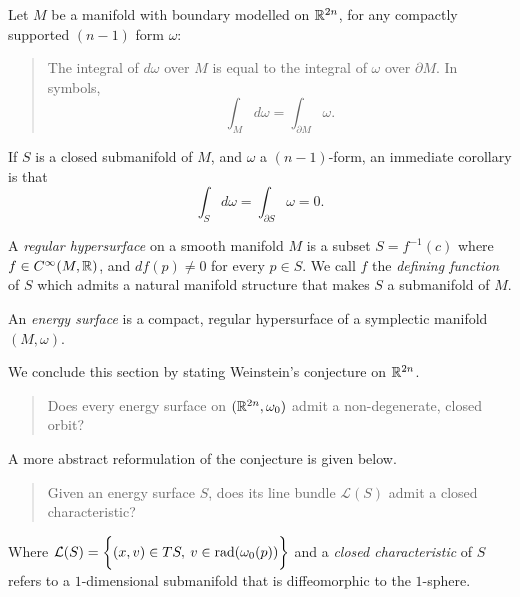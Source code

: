 \documentclass[../main-v2-manifolds.tex]{subfiles}
\begin{document}
\begin{remark}
    Let $M$ be a manifold with boundary modelled on ${\mathbb{R}^{2n}}$, for any compactly supported $(n-1)$ form $\omega$:
    \begin{quote}
        The integral of $d\omega$ over $M$ is equal to the integral of $\omega$ over $\partial M$. In symbols,
        \[\int_{M}d\omega = \int_{\partial M}\omega.\]
    \end{quote}
    If $S$ is a closed submanifold of $M$, and $\omega$ a $(n-1)$-form, an immediate corollary is that
    \[\int_S d\omega = \int_{\partial S}\omega = 0.\]
\end{remark}
\begin{definition}\label{def:regular hypersurface}
    A \emph{regular hypersurface} on a smooth manifold $M$ is a subset $S = f^{-1}(c)$ where $f\in C^\infty(M,\mathbb{R})$, and $df(p)\neq 0$ for every $p\in S$. We call $f$ the \emph{defining function} of $S$ which admits a natural manifold structure that makes $S$ a submanifold of $M$. 
\end{definition}
\begin{definition}\label{def:energy surface}
    An \emph{energy surface} is a compact, regular hypersurface of a symplectic manifold $(M,\omega)$.
\end{definition}
We conclude this section by stating Weinstein's conjecture on ${\mathbb{R}^{2n}}$.
\begin{quote}
    Does every energy surface on $({\mathbb{R}^{2n}},\omega_0)$ admit a non-degenerate, closed orbit?
\end{quote}
A more abstract reformulation of the conjecture is given below.
\begin{quote}
    Given an energy surface $S$, does its line bundle $\mathcal{L}(S)$ admit a closed characteristic?
\end{quote}
Where $\mathcal{L}(S) = \biggl\{{(x,v)\in TS,\:  v\in \operatorname{rad}({\omega_0(p)})}\biggr\}$ and a \emph{closed characteristic} of $S$ refers to a $1$-dimensional submanifold that is diffeomorphic to the $1$-sphere.
\end{document}
